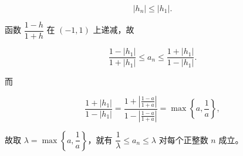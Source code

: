 \begin{answer}
\nopagebreak[4]
\[|h_n|\leqslant|h_1|.\]

函数 $\dfrac{1-h}{1+h}$ 在 $(-1,1)$ 上递减，故

\nopagebreak[4]
\[\frac{1-|h_1|}{1+|h_1|}\leqslant a_n\leqslant\frac{1+|h_1|}{1-|h_1|}.\]

而

\nopagebreak[4]
\[\frac{1+|h_1|}{1-|h_1|}=\frac{1+\left|\frac{1-a}{1+a}\right|}{1-\left|\frac{1-a}{1+a}\right|}=\max\left\{a,\frac1a\right\},\]

故取 $\lambda=\max\left\{a,\dfrac1a\right\}$，就有 $\dfrac1\lambda\leqslant a_n\leqslant\lambda$ 对每个正整数 $n$ 成立。


\end{answer}